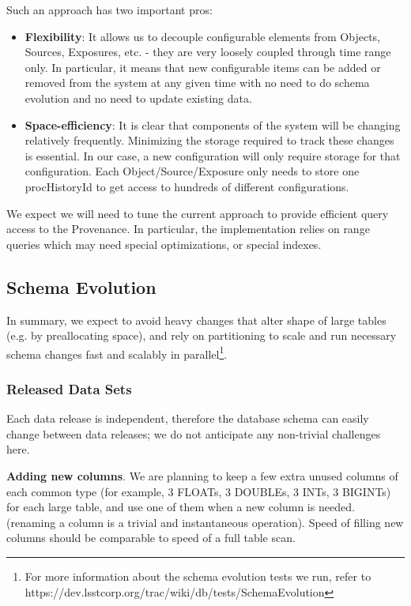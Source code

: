 \documentclass[DM,toc]{lsstdoc}
\begin{document}
Such an approach has two important pros:

\begin{itemize}
  \item \textbf{Flexibility}: It allows us to decouple configurable elements from Objects, Sources, Exposures, etc. - they are very loosely coupled through time range only. In particular, it means that new configurable items can be added or removed from the system at any given time with no need to do schema evolution and no need to update existing data.

  \item \textbf{Space-efficiency}: It is clear that components of the system will be changing relatively frequently. Minimizing the storage required to track these changes is essential. In our case, a new configuration will only require storage for that configuration. Each Object/Source/Exposure only needs to store one procHistoryId to get access to hundreds of different configurations.
\end{itemize}

We expect we will need to tune the current approach to provide efficient query access to the Provenance. In particular, the implementation relies on range queries which may need special optimizations, or special indexes.

\subsection{Schema Evolution}

In summary, we expect to avoid heavy changes that alter shape of large tables (e.g. by preallocating space), and rely on partitioning to scale and run necessary schema changes fast and scalably in parallel\footnote{For more information about the schema evolution tests we run, refer to https://dev.lsstcorp.org/trac/wiki/db/tests/SchemaEvolution}.

\subsubsection{Released Data Sets}

Each data release is independent, therefore the database schema can easily change between data releases; we do not anticipate any non-trivial challenges here.

\textbf{Adding new columns}. We are planning to keep a few extra unused columns of each common type (for example, 3 FLOATs, 3 DOUBLEs, 3 INTs, 3 BIGINTs) for each large table, and use one of them when a new column is needed. (renaming a column is a trivial and instantaneous operation). Speed of filling new columns should be comparable to speed of a full table scan.
\end{document}
